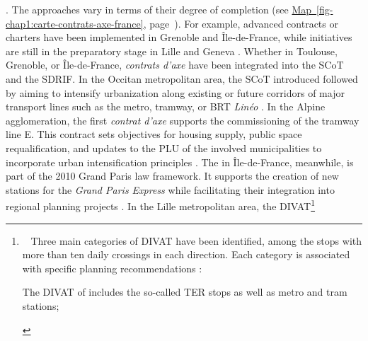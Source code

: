 \begin{refsegment}
{} \textcolor{blue}{\autocite[20]{afoun_mostaganem_2022}}. The approaches vary in terms of their degree of completion (see \hyperref[fig-chap1:carte-contrats-axe-france]{Map~\ref{fig-chap1:carte-contrats-axe-france}}, page~\pageref{fig-chap1:carte-contrats-axe-france}). For example, advanced contracts or charters have been implemented in Grenoble and Île-de-France, while initiatives are still in the preparatory stage in Lille and Geneva \textcolor{blue}{\autocites[2]{cerema_articuler_2010}[11]{cerema_articuler_2015}}. Whether in Toulouse, Grenoble, or Île-de-France, \textsl{contrats d'axe} have been integrated into the \acrfull{SCoT} and the \acrfull{SDRIF}. In the Occitan metropolitan area, the \acrfull{SCoT} introduced  followed by  aiming to intensify urbanization along existing or future corridors of major transport lines such as the metro, tramway, or \acrshort{BRT} \textsl{Linéo} \textcolor{blue}{\autocites[49]{toulouse_metropole_plui-h_2019}[26]{meunier-chabert_contrats_2014}[3]{cerema_outils_2021}}. In the Alpine agglomeration, the first \textsl{contrat d’axe} supports the commissioning of the tramway line E. This contract sets objectives for housing supply, public space requalification, and updates to the \acrfull{PLU} of the involved municipalities to incorporate urban intensification principles \textcolor{blue}{\autocites[3]{aurg_contrat_2022}[2]{cerema_outils_2021}}. The  in Île-de-France, meanwhile, is part of the 2010 Grand Paris law framework. It supports the creation of new stations for the \textsl{Grand Paris Express} while facilitating their integration into regional planning projects \textcolor{blue}{\autocite[19]{cerema_articuler_2015}}. In the Lille metropolitan area, the \acrshort{DIVAT}\footnote{~
    Three main categories of \acrfull{DIVAT} have been identified, among the stops with more than ten daily crossings in each direction. Each category is associated with specific planning recommendations \textcolor{blue}{\autocite[23]{cerema_articuler_2010}}:
        \begin{customitemize}
    \item The \acrshort{DIVAT} of  includes the so-called  \acrshort{TER} stops as well as metro and tram stations;

\end{customitemize}}
\end{refsegment}
